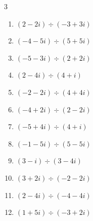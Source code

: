 \begin{multicols}{3}
\begin{enumerate}
  \item $\displaystyle (2-2i)\div(-3+3i)$


  \item $\displaystyle (-4-5i)\div(5+5i)$


  \item $\displaystyle (-5-3i)\div(2+2i)$


  \item $\displaystyle (2-4i)\div(4+i)$


  \item $\displaystyle (-2-2i)\div(4+4i)$


\columnbreak %

  \item $\displaystyle (-4+2i)\div(2-2i)$


  \item $\displaystyle (-5+4i)\div(4+i)$


  \item $\displaystyle (-1-5i)\div(5-5i)$


  \item $\displaystyle (3-i)\div(3-4i)$


  \item $\displaystyle (3+2i)\div(-2-2i)$


  \item $\displaystyle (2-4i)\div(-4-4i)$


  \item $\displaystyle (1+5i)\div(-3+2i)$


\end{enumerate}
\end{multicols}
